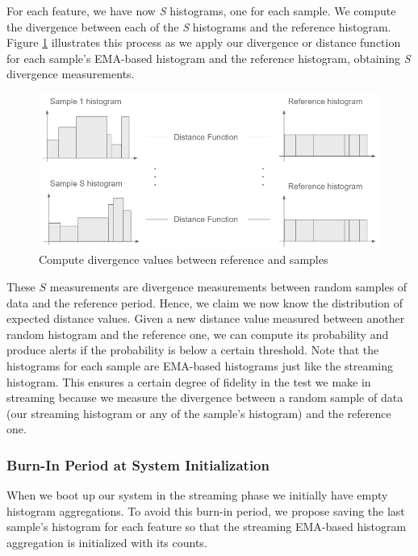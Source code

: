 \documentclass[sigconf]{acmart}
\begin{document}
For each feature, we have now \textit{S} histograms, one for each sample. We compute the divergence between each of the \textit{S} histograms and the reference histogram. Figure \ref{fig:compute-sample-distances} illustrates this process as we apply our divergence or distance function for each sample's EMA-based histogram and the reference histogram, obtaining \textit{S} divergence measurements.
\begin{figure}[!htb]
    \begin{center}
      \includegraphics[scale=0.4]{figures/compute-sample-distances.png}
      \caption[Compute sample's distance values]{Compute divergence values between reference and samples}
      \label{fig:compute-sample-distances}
    \end{center}
\end{figure}
These $S$ measurements are divergence measurements between random samples of data and the reference period. Hence, we claim we now know the distribution of expected distance values. Given a new distance value measured between another random histogram and the reference one, we can compute its probability and produce alerts if the probability is below a certain threshold. Note that the histograms for each sample are EMA-based histograms just like the streaming histogram. This ensures a certain degree of fidelity in the test we make in streaming because we measure the divergence between a random sample of data (our streaming histogram or any of the sample's histogram) and the reference one.

\subsubsection{Burn-In Period at System Initialization}
When we boot up our system in the streaming phase we initially have empty histogram aggregations. To avoid this burn-in period, we propose saving the last sample's histogram for each feature so that the streaming EMA-based histogram aggregation is initialized with its counts.
\end{document}
